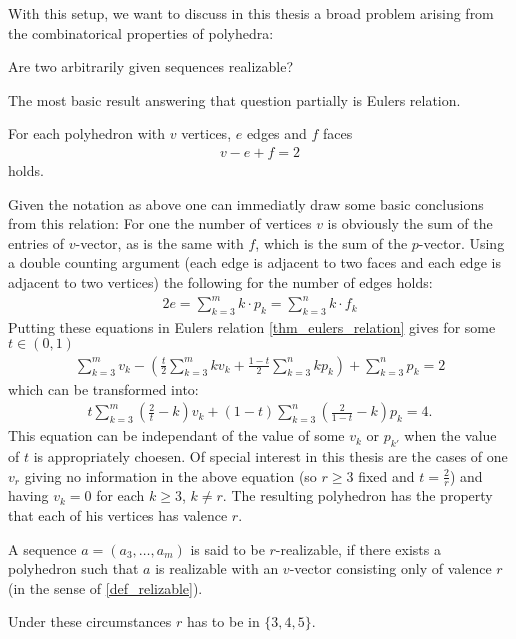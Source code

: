 With this setup, we want to discuss in this thesis a broad problem arising from the combinatorical properties of polyhedra:
\begin{problem} Are two arbitrarily given sequences realizable?
\end{problem}
The most basic result answering that question partially is Eulers relation.
\begin{theorem}\label{thm_eulers_relation}
  For each polyhedron with $v$ vertices, $e$ edges and $f$ faces
  \begin{align*}
    v - e + f = 2
  \end{align*}
  holds.
\end{theorem}
Given the notation as above one can immediatly draw some basic conclusions from this relation: For one the number of vertices $v$ is obviously the sum of the entries of $v$-vector, as is the same with $f$, which is the sum of the $p$-vector. Using a double counting argument (each edge is adjacent to two faces and each edge is adjacent to two vertices) the following for the number of edges holds:
\begin{align*}
  2e = \sum_{k=3}^{m} k \cdot p_k = \sum_{k=3}^{n} k \cdot f_k
\end{align*}
Putting these equations in Eulers relation \ref{thm_eulers_relation} gives for some $t \in (0, 1)$
\begin{align*}
  \sum_{k=3}^m v_k - \left(\frac{t}{2} \sum_{k=3}^m k v_k + \frac{1-t}{2} \sum_{k=3}^n k p_k \right) + \sum_{k=3}^n p_k = 2
\end{align*}
which can be transformed into:
\begin{align*}
  t \sum_{k=3}^m \left(\frac{2}{t} - k \right) v_k + (1-t) \sum_{k=3}^n \left( \frac{2}{1-t} - k \right) p_k = 4.
\end{align*}
This equation can be independant of the value of some $v_k$ or $p_{k'}$ when the value of $t$ is appropriately choesen. Of special interest in this thesis are the cases of one $v_r$ giving no information in the above equation (so $r \geq 3$ fixed and $t = \frac{2}{r}$) and having $v_{k} = 0$ for each $k \geq 3$, $k \neq r$. The resulting polyhedron has the property that each of his vertices has valence $r$. 
\begin{definition}[$r$-realizable]
  A sequence $a = (a_3, \dots, a_m)$ is said to be $r$-realizable, if there exists a polyhedron such that $a$ is realizable with an $v$-vector consisting only of valence $r$ (in the sense of \ref{def_relizable}).
\end{definition}
Under these circumstances $r$ has to be in $\{3, 4, 5\}$.

